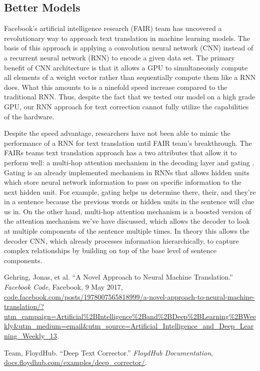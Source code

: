 \documentclass[11pt,a4paper]{scrartcl}
\theoremstyle{definition}
\begin{document}
\subsection{Better Models}
Facebook’s artificial intelligence research (FAIR) team has uncovered a revolutionary way to approach text translation in machine learning models. The basis of this approach is applying a convolution neural network (CNN) instead of a recurrent neural network (RNN) to encode a given data set. The primary benefit of CNN architecture is that it allows a GPU to simultaneously compute all elements of a weight vector rather than sequentially compute them like a RNN does. What this amounts to is a ninefold speed increase compared to the traditional RNN. Thus, despite the fact that we tested our model on a high grade GPU, our RNN approach for text correction cannot fully utilize the capabilities of the hardware. \newline

Despite the speed advantage, researchers have not been able to mimic the performance of a RNN for text translation until FAIR team’s breakthrough. The FAIRs teams text translation approach has a two attributes that allow it to perform well: a multi-hop attention mechanism in the decoding layer and gating \cite{Gehring}. Gating is an already implemented mechanism in RNNs that allows hidden units which store neural network information to pass on specific information to the next hidden unit. For example, gating helps us determine there, their, and they’re in a sentence because the previous words or hidden units in the sentence will clue us in. On the other hand, multi-hop attention mechanism is a boosted version of the attention mechanism we’ve have discussed, which allows the decoder to look at multiple components of the sentence multiple times. In theory this allows the decoder CNN, which already processes information hierarchically, to capture complex relationships by building on top of the base level of sentence components. 

\vspace{1em}

\begin{thebibliography}{7}
 Gehring, Jonas, et al. “A Novel Approach to Neural Machine Translation.” \emph{Facebook Code}, Facebook, 9 May 2017, \url{code.facebook.com/posts/1978007565818999/a-novel-approach-to-neural-machine-translation/?utm_campaign=Artificial%2BIntelligence%2Band%2BDeep%2BLearning%2BWeekly&utm_medium=email&utm_source=Artificial_Intelligence_and_Deep_Learning_Weekly_13}.

 Team, FloydHub. “Deep Text Corrector.” \emph{FloydHub Documentation}, \url{docs.floydhub.com/examples/deep_corrector/}.

\end{thebibliography}
\end{document}
